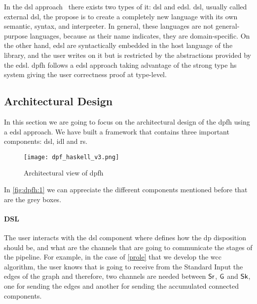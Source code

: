 In the \acrfull{dsl} approach~\cite{dsl} there exists two types of it: \acrfull{dsl} and \acrfull{edsl}. \acrshort{dsl}, usually called external \acrshort{dsl}, the propose is to create a completely new language with its own semantic, syntax, and interpreter. 
In general, these languages are not general-purpose languages, because as their name indicates, they are domain-specific. On the other hand, \acrshort{edsl} are syntactically embedded in the host language of the library, and the user writes on it but is restricted by the abstractions provided by the \acrshort{edsl}.
\acrshort{dpfh} follows a \acrshort{edsl} approach taking advantage of the strong type \acrshort{hs} system giving the user correctness proof at type-level.

\subsection{Architectural Design}
In this section we are going to focus on the architectural design of the \acrshort{dpfh} using a \acrshort{edsl} approach. We have built a framework that contains
three important components: \acrshort{dsl}, \acrshort{idl} and \acrshort{rs}. 

\begin{figure}[!ht]
  \centering
  \begin{minipage}{\textwidth}
   \texttt{[image: dpf\_haskell\_v3.png]}
    \caption{Architectural view of \acrshort{dpfh}}
    \label{fig:dpfh:1}
  \end{minipage}
\end{figure}

In \autoref{fig:dpfh:1} we can appreciate the different components mentioned before that are the grey boxes.

\paragraph{DSL} The user interacts with the \acrshort{dsl} component where defines how the \acrshort{dp} disposition
should be, and what are the channels that are going to communicate the stages of the pipeline. For example, in the
case of \autoref{prole} that we develop the \acrshort{wcc} algorithm, the user knows that is going to receive from the Standard Input 
the edges of the graph and therefore, two channels are needed between $\mathsf{Sr}$, $\mathsf{G}$ and $\mathsf{Sk}$, one for sending the edges and another for sending
the accumulated connected components. 

